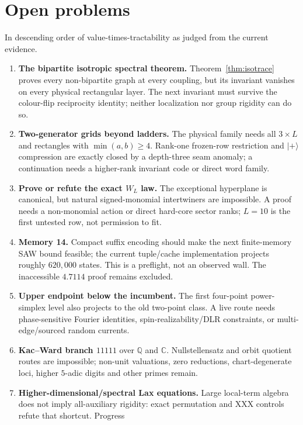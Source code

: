 \documentclass[11pt]{article}
\theoremstyle{definition}
\newcommand{\Qb}{\mathbb{Q}}
\newcommand{\Cb}{\mathbb{C}}
\begin{document}
\section{Open problems}\label{sec:open}
In descending order of value-times-tractability as judged from the current evidence.
\begin{enumerate}[leftmargin=*,itemsep=2pt]
\item \textbf{The bipartite isotropic spectral theorem.} Theorem~\ref{thm:isotrace} proves every
      non-bipartite graph at every coupling, but its invariant vanishes on every physical rectangular
      layer. The next invariant must survive the colour-flip reciprocity identity; neither
      localization nor group rigidity can do so.
\item \textbf{Two-generator grids beyond ladders.} The physical family needs all $3\times L$ and
      rectangles with $\min(a,b)\ge4$. Rank-one frozen-row restriction and $\lvert+\rangle$
      compression are exactly closed by a depth-three seam anomaly; a continuation needs a
      higher-rank invariant code or direct word family.
\item \textbf{Prove or refute the exact $W_L$ law.} The exceptional hyperplane is canonical, but
      natural signed-monomial intertwiners are impossible. A proof needs a non-monomial action or
      direct hard-core sector ranks; $L=10$ is the first untested row, not permission to fit.
\item \textbf{Memory 14.} Compact suffix encoding should make the next finite-memory SAW bound
      feasible; the current tuple/cache implementation projects roughly $620{,}000$ states. This is
      a preflight, not an observed wall. The inaccessible $4.7114$ proof remains excluded.
\item \textbf{Upper endpoint below the incumbent.} The first four-point power-simplex level also
      projects to the old two-point class. A live route needs phase-sensitive Fourier identities,
      spin-realizability/DLR constraints, or multi-edge/sourced random currents.
\item \textbf{Kac--Ward branch $11111$} over $\Qb$ and $\Cb$. Nullstellensatz and orbit quotient
      routes are impossible; non-unit valuations, zero reductions, chart-degenerate loci, higher
      $5$-adic digits and other primes remain.
\item \textbf{Higher-dimensional/spectral Lax equations.} Large local-term algebra does not imply
      all-auxiliary rigidity: exact permutation and XXX controls refute that shortcut. Progress

\end{enumerate}
\end{document}

